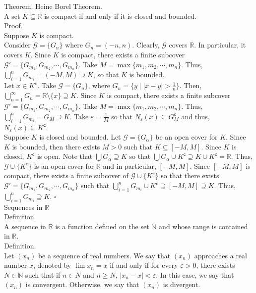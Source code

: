 \documentclass[twocolumn]{article}
\newcommand{\qed}{$\square$}
\newcommand{\COMPLEMENT}{^\mathsf{c}}
\let\complement\COMPLEMENT
\let\eps\varepsilon
\newcommand{\naturals}{\mathbb{N}}
\newcommand{\reals}{\mathbb{R}}
\begin{document}
Theorem. Heine Borel Theorem. \\
A set $K \subseteq \reals$ is compact if and only if it is closed and bounded. \\
Proof. \\
Suppose $K$ is compact. \\
Consider $\mathcal{G} = \{ G_n \}$ where $G_n = (-n, n)$. Clearly, $\mathcal{G}$ covers $\reals$. In particular, it covers $K$. Since $K$ is compact, there exists a finite subcover $\mathcal{G'} = \{ G_{m_1}, G_{m_2}, \cdots, G_{m_n} \}$. Take $M = \max \{ m_1, m_2, \cdots, m_n \}$. Thus, $\bigcup_{i = 1}^n G_{m_i} = (-M, M) \supseteq K$, so that $K$ is bounded. \\
Let $x \in K\complement$. Take $\mathcal{G} = \{ G_n \}$, where $G_n = \{ y \mid |x - y| > \frac{1}{n} \}$. Then, $\bigcup_{n = 1}^\infty G_n = \reals \setminus \{ x \} \supseteq K$. Since $K$ is compact, there exists a finite subcover $\mathcal{G'} = \{ G_{m_1}, G_{m_2}, \cdots, G_{m_n} \}$. Take $M = \max \{ m_1, m_2, \cdots, m_n \}$. Thus, $\bigcup_{i = 1}^n G_{m_i} = G_M \supseteq K$. Take $\eps = \frac{1}{M}$ so that $N_\eps(x) \subseteq G_M\complement$ and thus, $N_\eps(x) \subseteq K\complement$. \\
Suppose $K$ is closed and bounded. Let $\mathcal{G} = \{ G_\alpha \}$ be an open cover for $K$. Since $K$ is bounded, then there exists $M > 0$ such that $K \subseteq [-M, M]$. Since $K$ is closed, $K\complement$ is open. Note that $\bigcup G_\alpha \supseteq K$ so that $\bigcup G_\alpha \cup K\complement \supseteq K \cup K\complement = \reals$. Thus, $\mathcal{G} \cup \{ K\complement \}$ is an open cover for $\reals$ and in particular, $[-M, M]$. Since $[-M, M]$ is compact, there exists a finite subcover of $\mathcal{G} \cup \{ K\complement \}$ so that there exists $\mathcal{G'} = \{ G_{m_1}, G_{m_2}, \cdots, G_{m_n} \}$ such that $\bigcup_{i = 1}^n G_{m_i} \cup K\complement \supseteq [-M, M] \supseteq K$. Thus, $\bigcup_{i = 1}^n G_{m_i} \supseteq K$. \qed \\

Sequences in $\reals$ \\

Definition. \\
A sequence in $\reals$ is a function defined on the set $\naturals$ and whose range is contained in $\reals$. \\

Definition. \\
Let $(x_n)$ be a sequence of real numbers. We say that $(x_n)$ approaches a real number $x$, denoted by $\lim x_n = x$ if and only if for every $\eps > 0$, there exists $N \in \naturals$ such that if $n \in N$ and $n \geq N$, $|x_n - x| < \eps$. In this case, we say that $(x_n)$ is convergent. Otherwise, we say that $(x_n)$ is divergent. \\
\end{document}
